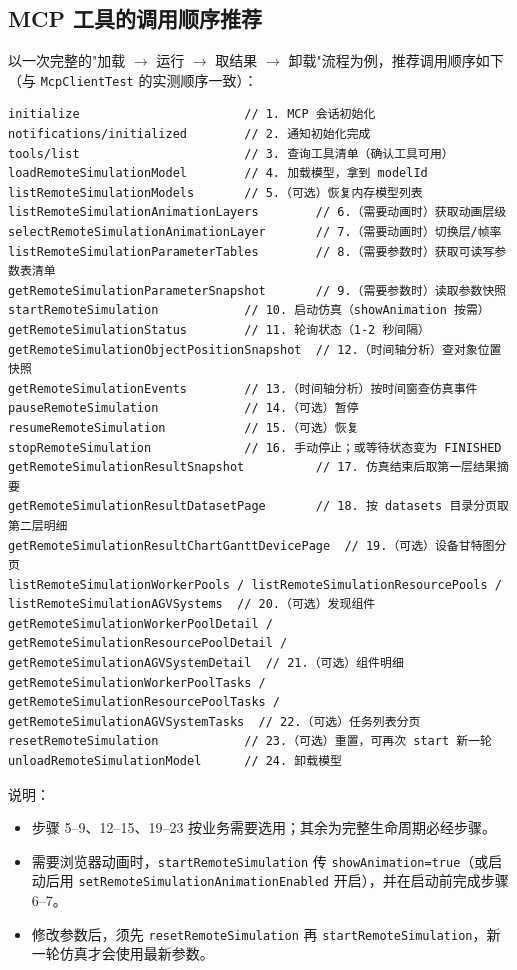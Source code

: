 \subsection{MCP 工具的调用顺序推荐}
以一次完整的"加载 $\rightarrow$ 运行 $\rightarrow$ 取结果 $\rightarrow$ 卸载"流程为例，推荐调用顺序如下（与 \texttt{McpClientTest} 的实测顺序一致）：
\begin{lstlisting}
initialize                       // 1. MCP 会话初始化
notifications/initialized        // 2. 通知初始化完成
tools/list                       // 3. 查询工具清单（确认工具可用）
loadRemoteSimulationModel        // 4. 加载模型，拿到 modelId
listRemoteSimulationModels       // 5.（可选）恢复内存模型列表
listRemoteSimulationAnimationLayers        // 6.（需要动画时）获取动画层级
selectRemoteSimulationAnimationLayer       // 7.（需要动画时）切换层/帧率
listRemoteSimulationParameterTables        // 8.（需要参数时）获取可读写参数表清单
getRemoteSimulationParameterSnapshot       // 9.（需要参数时）读取参数快照
startRemoteSimulation            // 10. 启动仿真（showAnimation 按需）
getRemoteSimulationStatus        // 11. 轮询状态（1-2 秒间隔）
getRemoteSimulationObjectPositionSnapshot  // 12.（时间轴分析）查对象位置快照
getRemoteSimulationEvents        // 13.（时间轴分析）按时间窗查仿真事件
pauseRemoteSimulation            // 14.（可选）暂停
resumeRemoteSimulation           // 15.（可选）恢复
stopRemoteSimulation             // 16. 手动停止；或等待状态变为 FINISHED
getRemoteSimulationResultSnapshot          // 17. 仿真结束后取第一层结果摘要
getRemoteSimulationResultDatasetPage       // 18. 按 datasets 目录分页取第二层明细
getRemoteSimulationResultChartGanttDevicePage  // 19.（可选）设备甘特图分页
listRemoteSimulationWorkerPools / listRemoteSimulationResourcePools / listRemoteSimulationAGVSystems  // 20.（可选）发现组件
getRemoteSimulationWorkerPoolDetail / getRemoteSimulationResourcePoolDetail / getRemoteSimulationAGVSystemDetail  // 21.（可选）组件明细
getRemoteSimulationWorkerPoolTasks / getRemoteSimulationResourcePoolTasks / getRemoteSimulationAGVSystemTasks  // 22.（可选）任务列表分页
resetRemoteSimulation            // 23.（可选）重置，可再次 start 新一轮
unloadRemoteSimulationModel      // 24. 卸载模型
\end{lstlisting}\vspace{-30pt}
说明：
\begin{itemize}
	\item 步骤 5--9、12--15、19--23 按业务需要选用；其余为完整生命周期必经步骤。
	\item 需要浏览器动画时，\texttt{startRemoteSimulation} 传 \texttt{showAnimation=true}（或启动后用 \texttt{setRemoteSimulationAnimationEnabled} 开启），并在启动前完成步骤 6--7。
	\item 修改参数后，须先 \texttt{resetRemoteSimulation} 再 \texttt{startRemoteSimulation}，新一轮仿真才会使用最新参数。
\end{itemize}

